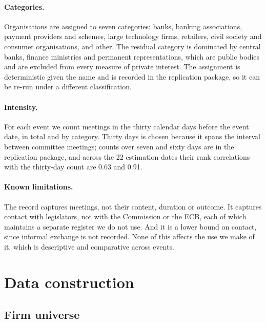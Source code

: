 \documentclass[11pt]{article}
\theoremstyle{plain}\newtheorem{proposition}{Proposition}
\begin{document}
\paragraph{Categories.} Organisations are assigned to seven categories: banks, banking associations, payment providers and schemes, large technology firms, retailers, civil society and consumer organisations, and other. The residual category is dominated by central banks, finance ministries and permanent representations, which are public bodies and are excluded from every measure of private interest. The assignment is deterministic given the name and is recorded in the replication package, so it can be re-run under a different classification.

\paragraph{Intensity.} For each event we count meetings in the thirty calendar days before the event date, in total and by category. Thirty days is chosen because it spans the interval between committee meetings; counts over seven and sixty days are in the replication package, and across the 22 estimation dates their rank correlations with the thirty-day count are 0.63 and 0.91.

\paragraph{Known limitations.} The record captures meetings, not their content, duration or outcome. It captures contact with legislators, not with the Commission or the ECB, each of which maintains a separate register we do not use. And it is a lower bound on contact, since informal exchange is not recorded. None of this affects the use we make of it, which is descriptive and comparative across events.

\section{Data construction}\label{app:data}

\subsection{Firm universe}
\scriptsize

\normalsize
\end{document}
